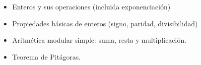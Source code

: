 \begin{itemize}
\item[\basic] Enteros y sus operaciones (incluida exponenciación)
\item[\basic] Propiedades básicas de enteros (signo, paridad, divisibilidad)
\item[\basic] Aritmética modular simple: suma, resta y multiplicación.
\item[\basic] Teorema de Pitágoras.
\end{itemize}

